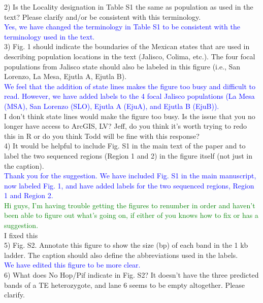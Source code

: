 \documentclass[11pt]{article}
\newcommand{\res}[1]{\noindent \textcolor{blue}{{#1}} \\}
\newcommand{\lev}[1]{\noindent \textcolor{green}{{#1}} \\}
\newcommand{\mbh}[1]{\noindent \textcolor{Dandelion}{{#1}}\\}
\begin{document}
2) Is the Locality designation in Table S1 the same as population as used in the text? Please clarify and/or be consistent with this terminology.\\

\res{Yes, we have changed the terminology in Table S1 to be consistent with the terminology used in the text.}

3) Fig. 1 should indicate the boundaries of the Mexican states that are used in describing population locations in the text (Jalisco, Colima, etc.). The four focal populations from Jalisco state should also be labeled in this figure (i.e., San Lorenzo, La Mesa, Ejutla A, Ejutla B).\\

\res{We feel that the addition of state lines makes the figure too busy and difficult to read. However, we have added labels to the 4 focal Jalisco populations (La Mesa (MSA), San Lorenzo (SLO), Ejutla A (EjuA), and Ejutla B (EjuB)).}

\mbh{I don't think state lines would make the figure too busy.  Is the issue that you no longer have access to ArcGIS, LV?  Jeff, do you think it's worth trying to redo this in R or do you think Todd will be fine with this response?}

4) It would be helpful to include Fig. S1 in the main text of the paper and to label the two sequenced regions (Region 1 and 2) in the figure itself (not just in the caption). \\

\res{Thank you for the suggestion. We have included Fig. S1 in the main manuscript, now labeled Fig. 1, and have added labels for the two sequenced regions, Region 1 and Region 2.}

\lev{Hi guys, I'm having trouble getting the figures to renumber in order and haven't been able to figure out what's going on, if either of you knows how to fix or has a suggestion.}

\mbh{I fixed this}

5) Fig. S2. Annotate this figure to show the size (bp) of each band in the 1 kb ladder. The caption should also define the abbreviations used in the labels. \\

\res{We have edited this figure to be more clear.}

6) What does No Hop/Pif indicate in Fig. S2? It doesn't have the three predicted bands of a TE heterozygote, and lane 6 seems to be empty altogether. Please clarify. \\
\end{document}
